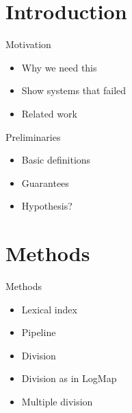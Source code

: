 \documentclass[t]{beamer}
\title{}
\subtitle{We Divide, You Conquer: From Large-scale Ontology Alignment to Manageable Subtasks}
\date{October 8, 2018}
\author{\textbf{Ernesto Jim\'enez-Ruiz}, Asan Agibetov, Matthias Samwald, Valerie Cross}
\begin{document}
\begin{frame}
	\titlepage
\end{frame}


\section{Introduction}



\begin{frame}{Motivation}
	
  		\begin{itemize}    
  			\item Why we need this
  			\item Show systems that failed
  			\item Related work
		\end{itemize}
  	
\end{frame}


\begin{frame}{Preliminaries}
	
  		\begin{itemize}    
  			\item Basic definitions
  			\item Guarantees
  			\item Hypothesis?
		\end{itemize}
  	
\end{frame}


\section{Methods}


\begin{frame}{Methods}
	
  		\begin{itemize}    
  			\item Lexical index
  			\item Pipeline
  			\item Division
  			\item Division as in LogMap
  			\item Multiple division
		\end{itemize}
  	
\end{frame}
\end{document}
